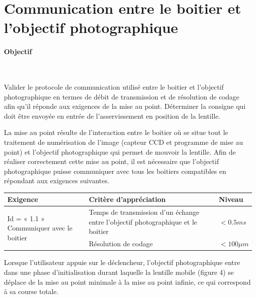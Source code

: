 \section{Communication entre le boitier et l'objectif photographique}

\paragraph{Objectif} ~\

Valider le protocole de communication utilisé entre le boitier et l'objectif photographique en termes de débit de transmission et de résolution de codage afin qu'il réponde aux exigences de la mise au point. Déterminer la consigne qui doit être envoyée en entrée de l'asservissement en position de la lentille.

La mise au point résulte de l'interaction entre le boitier où se situe tout le traitement de numérisation de l'image (capteur CCD et programme de mise au point) et l'objectif photographique qui permet de mouvoir la
lentille. Afin de réaliser correctement cette mise au point, il est nécessaire que l'objectif photographique puisse communiquer avec tous les boitiers compatibles en répondant aux exigences suivantes.

\begin{center}
\begin{tabular}{|p{6.7cm}|p{7cm}|p{1.7cm}|}
\hline
Exigence & Critère d'appréciation & Niveau \\
\hline
\multirow{2}{*}{Id = « 1.1 » Communiquer avec le boitier} & Temps de transmission d'un échange entre l'objectif
photographique et le boitier & $<0.5ms$\\
\cline{2-3}
& Résolution de codage & $< 100 \mu m$\\
\hline
\end{tabular}
\end{center}

Lorsque l'utilisateur appuie sur le déclencheur, l'objectif photographique entre dans une phase d'initialisation durant laquelle la lentille mobile (figure 4) se déplace de la mise au point minimale à la mise au point infinie, ce qui correspond à sa course totale.

